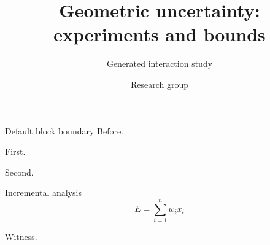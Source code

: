 \documentclass[9pt,aspectratio=43]{beamer}
\title{Geometric uncertainty: experiments and bounds}
\subtitle{Generated interaction study}
\author{Research group}
\date{}
\begin{document}
\begin{frame}[t,shrink=5]{Default block boundary}
Before.\par\begin{description}\item<1->[Stage 1] First.\item<2->[Stage 2] Second.
\item<3->[Stage 3] \begin{block}{Incremental analysis}\[E=\sum_{i=1}^{n}w_i x_i\]\end{block}\end{description}\par Witness.\end{frame}
\end{document}

